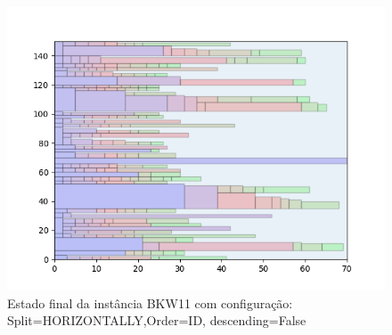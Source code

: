 \begin{figure}[H]
    \centering
    \caption[]{Estado final da instância BKW11 com configuração: Split=HORIZONTALLY,Order=ID, descending=False}
    \label{fig:bkw11-horizontally-id-false}
    \includegraphics[scale=0.5]{output/figures/bkw/bkw11/horizontally/id/false/000}
\end{figure}